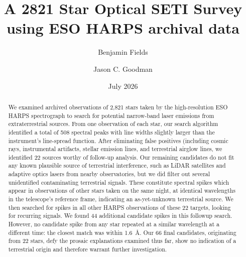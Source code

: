 \documentclass[twocolumn]{aastex701}
\begin{document}
\title{A 2821 Star Optical SETI Survey using ESO HARPS archival data}
\author[0009-0008-7048-916X]{Benjamin Fields} %

\author[0000-0002-6755-2710]{Jason C. Goodman}

\date{July 2026}

\begin{abstract}
We examined archived observations of 2,821 stars taken by the high-resolution ESO HARPS spectrograph to search for potential narrow-band laser emissions from extraterrestrial sources. From one observation of each star, our search algorithm identified a total of 508 spectral peaks with line widths slightly larger than the instrument's line-spread function.  After eliminating  false positives (including cosmic rays, instrumental artifacts, stellar emission lines, and terrestrial airglow lines, we identified 22 sources worthy of follow-up analysis.  Our remaining candidates do not fit any known plausible source of terrestrial interference, such as LiDAR satellites and adaptive optics lasers from nearby observatories, but we did filter out several unidentified contaminating terrestrial signals. These constitute spectral spikes which appear in observations of other stars taken on the same night, at identical wavelengths in the telescope's reference frame, indicating an as-yet-unknown terrestrial source.  We then searched for spikes in all other HARPS observations of these 22 targets, looking for recurring signals. We found 44 additional candidate spikes in this followup search.  However, no candidate spike from any star repeated at a similar wavelength at a different time: the closest match was within 1.6~\AA. Our 66 final candidates, originating from 22 stars, defy the prosaic explanations examined thus far,  show no indication of a terrestrial origin and therefore warrant further investigation.
\end{abstract}
\end{document}
